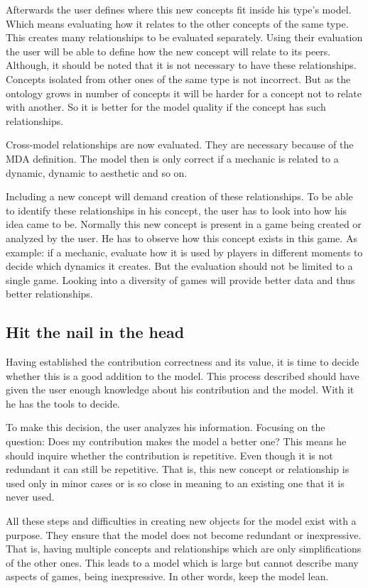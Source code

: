 Afterwards the user defines where this new concepts fit inside his type's model. Which means evaluating how it relates to the other concepts of the same type. This creates many relationships to be evaluated separately. Using their evaluation the user will be able to define how the new concept will relate to its peers. Although, it should be noted that it is not necessary to have these relationships. Concepts isolated from other ones of the same type is not incorrect. But as the ontology grows in number of concepts it will be harder for a concept not to relate with another. So it is better for the model quality if the concept has such relationships.

Cross-model relationships are now evaluated. They are necessary because of the MDA definition. The model then is only correct if a mechanic is related to a dynamic, dynamic to aesthetic and so on.

Including a new concept will demand creation of these relationships. To be able to identify these relationships in his concept, the user has to look into how his idea came to be. Normally this new concept is present in a game being created or analyzed by the user. He has to observe how this concept exists in this game. As example: if a mechanic, evaluate how it is used by players in different moments to decide which dynamics it creates. But the evaluation should not be limited to a single game. Looking into a diversity of games will provide better data and thus better relationships.

\subsection{Hit the nail in the head}

Having established the contribution correctness and its value, it is time to decide whether this is a good addition to the model. This process described should have given the user enough knowledge about his contribution and the model. With it he has the tools to decide.

To make this decision, the user analyzes his information. Focusing on the question: Does my contribution makes the model a better one? This means he should inquire whether the contribution is repetitive. Even though it is not redundant it can still be repetitive. That is, this new concept or relationship is used only in minor cases or is so close in meaning to an existing one that it is never used.

All these steps and difficulties in creating new objects for the model exist with a purpose. They ensure that the model does not become redundant or inexpressive. That is, having multiple concepts and relationships which are only simplifications of the other ones. This leads to a model which is large but cannot describe many aspects of games, being inexpressive. In other words, keep the model lean. 